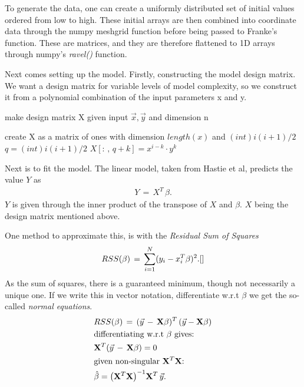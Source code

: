 \documentclass[ 12pt, a4paper ]{article}
\begin{document}
To generate the data, one can create a uniformly distributed set of initial values ordered 
from low to high. These initial arrays are then combined into coordinate data through the 
numpy meshgrid function before being passed to Franke's function. These are matrices, and 
they are therefore flattened to 1D arrays through numpy's \textit{ravel()} function.

Next comes setting up the model. Firstly, constructing the model design matrix. We want a
design matrix for variable levels of model complexity, so we construct it from a polynomial
combination of the input parameters x and y. 
\begin{algorithm}
\caption{make design matrix X given input $\vec{x}, \vec{y}$ and dimension n}
\begin{algorithmic}
\STATE  create X as a matrix of ones with dimension $length(x)$ and $(int) i(i+1)/2$
\STATE $q = (int) i(i+1)/2$
\STATE $X[:\,,\,q+k] = x^{i - k} \cdot y^k $
\ENDFOR
\ENDFOR
\end{algorithmic}
\end{algorithm}

Next is to fit the model. The linear model, taken from Hastie et al\cite{}, predicts the 
value $Y$ as 
\begin{align}
    Y \,=\, X^T \, \beta.
\end{align}
$Y$ is given through the inner product of the transpose of $X$ and $\beta$.
$X$ being the design matrix mentioned above. 

One method to approximate this, is with the \textit{Residual Sum of Squares}
\begin{align}
    RSS(\beta) \,=\, \sum_{i=1}^N (y_i - x_i^T\beta)^2.\cite{}
\end{align}
As the sum of squares, there is a guaranteed minimum, though not necessarily a unique one. 
If we write this in vector notation, differentiate w.r.t $\beta$ we get the so-called 
\textit{normal equations}. 
\begin{align}
    &RSS(\beta) \,=\, ( \vec{y} \,-\, \mathbf{X}\beta )^T \, ( \vec{y} - \mathbf{X}\beta )
    \nonumber \\
    &\text{differentiating w.r.t $\beta$ gives:} \nonumber \\
    &    \mathbf{X}^T(\vec{y} \,-\, \mathbf{X}\beta) = 0 \nonumber \\
    &\text{given non-singular $\mathbf{X}^T\mathbf{X}$:} \nonumber \\
    & \hat{\beta} = \qty(\mathbf{X}^T\mathbf{X})^{-1}\mathbf{X}^T\,\vec{y}.
\end{align}
\end{document}
